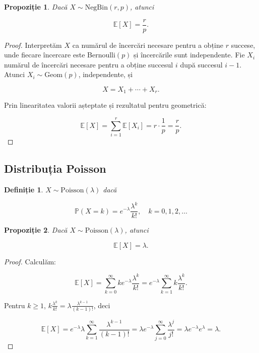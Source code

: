 \documentclass[12pt]{article}
\theoremstyle{plain}
\newtheorem{definition}{Definiție}
\newtheorem{proposition}{Propoziție}
\begin{document}
\begin{proposition}
Dacă $X \sim \mathrm{NegBin}(r,p)$, atunci


\[
\mathbb{E}[X] = \frac{r}{p}.
\]


\end{proposition}

\begin{proof}
Interpretăm $X$ ca numărul de încercări necesare pentru a obține $r$ succese,
unde fiecare încercare este Bernoulli$(p)$ și încercările sunt independente.
Fie $X_i$ numărul de încercări necesare pentru a obține succesul $i$ după succesul $i-1$.
Atunci $X_i \sim \mathrm{Geom}(p)$, independente, și


\[
X = X_1 + \cdots + X_r.
\]


Prin linearitatea valorii așteptate și rezultatul pentru geometrică:


\[
\mathbb{E}[X] = \sum_{i=1}^r \mathbb{E}[X_i] = r \cdot \frac{1}{p} = \frac{r}{p}.
\]


\end{proof}

\subsection{Distribuția Poisson}

\begin{definition}
$X \sim \mathrm{Poisson}(\lambda)$ dacă


\[
\mathbb{P}(X = k) = e^{-\lambda} \frac{\lambda^k}{k!},\quad k=0,1,2,\dots
\]


\end{definition}

\begin{proposition}
Dacă $X \sim \mathrm{Poisson}(\lambda)$, atunci


\[
\mathbb{E}[X] = \lambda.
\]


\end{proposition}

\begin{proof}
Calculăm:


\[
\mathbb{E}[X] = \sum_{k=0}^{\infty} k e^{-\lambda} \frac{\lambda^k}{k!}
= e^{-\lambda} \sum_{k=1}^{\infty} k \frac{\lambda^k}{k!}.
\]


Pentru $k\ge1$, $k \frac{\lambda^k}{k!} = \lambda \frac{\lambda^{k-1}}{(k-1)!}$, deci


\[
\mathbb{E}[X] = e^{-\lambda} \lambda \sum_{k=1}^{\infty} \frac{\lambda^{k-1}}{(k-1)!}
= \lambda e^{-\lambda} \sum_{j=0}^{\infty} \frac{\lambda^{j}}{j!}
= \lambda e^{-\lambda} e^{\lambda} = \lambda.
\]


\end{proof}
\end{document}
